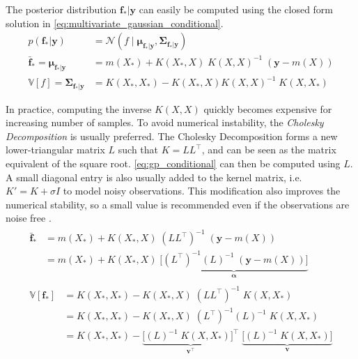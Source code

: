 The posterior distribution $\boldsymbol{f}_* | \boldsymbol{y}$ can easily be computed using the closed form solution in \cref{eq:multivariate_gaussian_conditional}.
\begin{subequations}\label{eq:gp_conditional}
\begin{align}
    p(\boldsymbol{f}_* | \boldsymbol{y}) &= \mathcal{N}(f \; | \; \boldsymbol{\mu}_{\boldsymbol{f}_*|\boldsymbol{y}}, \boldsymbol{\Sigma}_{\boldsymbol{f}_*|\boldsymbol{y}})\\
    \bar{\boldsymbol{f}}_* = \boldsymbol{\mu}_{\boldsymbol{f}_* | \boldsymbol{y}} &= m(X_*) + K(X_*, X) \; K(X, X)^{-1} \; (\boldsymbol{y} - m(X))\label{eq:gp_conditional_mean}\\
    \mathbb{V}[f] = \boldsymbol{\Sigma}_{\boldsymbol{f}_* | \boldsymbol{y}} &= K(X_*, X_*) - K(X_*, X)  K(X, X)^{-1} \; K(X, X_*)\label{eq:gp_conditional_var}
\end{align}
\end{subequations}

In practice, computing the inverse $K(X, X)$ quickly becomes expensive for increasing number of samples. To avoid numerical instability, the \textit{Cholesky Decomposition} is usually preferred. The Cholesky Decomposition forms a new lower-triangular matrix $L$ such that $K = L L^\intercal$, and can be seen as the matrix equivalent of the square root. \cref{eq:gp_conditional} can then be computed using $L$. A small diagonal entry is also usually added to the kernel matrix, i.e. $K' = K + \sigma I$ to model noisy observations. This modification also improves the numerical stability, so a small value is recommended even if the observations are noise free \cite{scikit-learn}.
\begin{subequations}
\begin{align}
    \begin{split}
    \bar{\boldsymbol{f}}_* &= m(X_*) + K(X_*, X) \; (L L^\intercal)^{-1} \; (\boldsymbol{y} - m(X))\\ &= m(X_*) + K(X_*, X) \; \underbrace{\big[(L^\intercal)^{-1} (L)^{-1}  \; (\boldsymbol{y} - m(X))\big]}_{\boldsymbol{\alpha}}
    \end{split}\\
    \begin{split}
    \mathbb{V}[\boldsymbol{f}_*] &= K(X_*, X_*) - K(X_*, X) \; (L L^\intercal)^{-1} \; K(X, X_*)\\
    &= K(X_*, X_*) - K(X_*, X) \; (L^\intercal)^{-1} (L)^{-1} \; K(X, X_*)\\
    &= K(X_*, X_*) - \underbrace{\big[(L)^{-1} \; K(X, X_*)\big]^\intercal}_{\boldsymbol{v^\intercal}} \; \underbrace{\big[(L)^{-1} \; K(X, X_*)\big]}_{\boldsymbol{v}}
    \end{split}
\end{align}
\end{subequations}

